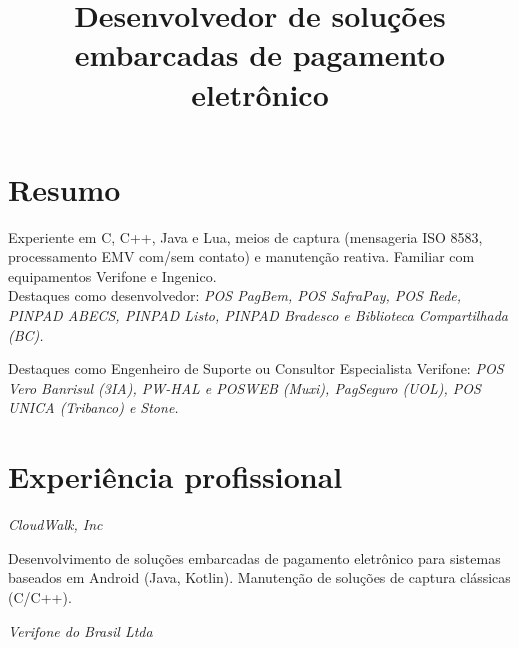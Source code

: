 \documentclass[11pt,a4paper,sans]{moderncv}
\title{\Large Desenvolvedor de soluções\protect\\embarcadas de pagamento eletrônico}
\begin{document}
\maketitle

\section{Resumo}

\vspace{0.5mm}

\hspace{1.25cm} Experiente em C, C++, Java e Lua, meios de captura (mensageria
ISO 8583, processamento EMV com/sem contato) e manutenção reativa. Familiar com
equipamentos Verifone e Ingenico.\protect\\

\hspace{1.25cm} Destaques como desenvolvedor: \textit{POS PagBem, POS SafraPay,
POS Rede, PINPAD ABECS, PINPAD Listo, PINPAD Bradesco e Biblioteca
Compartilhada (BC).}

\hspace{1.25cm} Destaques como Engenheiro de Suporte ou Consultor Especialista
Verifone: \textit{POS Vero Banrisul (3IA), PW-HAL e POSWEB (Muxi), PagSeguro
(UOL), POS UNICA (Tribanco) e Stone.}

\section{Experiência profissional}

\vspace{0.5mm}

\hspace{1.25cm} \textit{CloudWalk, Inc}


\hspace{1.25cm} \begin{minipage}[htb]{\linewidth - 1.25cm}
    Desenvolvimento de soluções embarcadas de pagamento eletrônico para
    sistemas baseados em Android (Java, Kotlin). Manutenção de soluções de
    captura clássicas (C/C++).
\end{minipage}

\vspace{\baselineskip}

\hspace{1.25cm} \textit{Verifone do Brasil Ltda}
\end{document}
